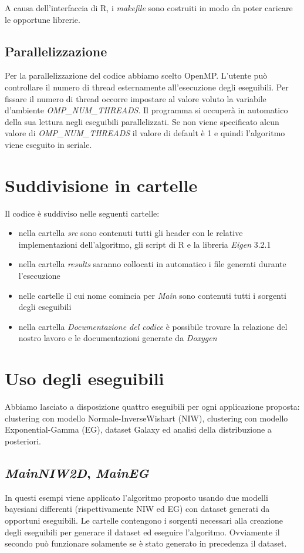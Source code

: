 \documentclass[a4paper,12pt]{report}							%
\begin{document}
A causa dell'interfaccia di R, i \textit{makefile} sono costruiti in modo da poter caricare le opportune librerie.

\section{Parallelizzazione}
Per la parallelizzazione del codice abbiamo scelto OpenMP.
L'utente può controllare il numero di thread esternamente all'esecuzione degli eseguibili.
Per fissare il numero di thread occorre impostare al valore voluto la variabile d'ambiente \textit{OMP\_NUM\_THREADS}. 
Il programma si occuperà in automatico della sua lettura negli eseguibili parallelizzati.
Se non viene specificato alcun valore di \textit{OMP\_NUM\_THREADS} il valore di default è 1 e quindi l'algoritmo
viene eseguito in seriale.

\chapter{Suddivisione in cartelle}
Il codice è suddiviso nelle seguenti cartelle:
\begin{itemize}
 \item nella cartella \textit{src} sono contenuti tutti gli header con le relative implementazioni dell'algoritmo,
 gli script di R e la libreria \textit{Eigen} 3.2.1
 \item nella cartella \textit{results} saranno collocati in automatico i file generati durante l'esecuzione
 \item nelle cartelle il cui nome comincia per \textit{Main} sono contenuti tutti i sorgenti degli eseguibili
 \item nella cartella \textit{Documentazione del codice} è possibile trovare la relazione del nostro lavoro e le documentazioni generate da
 \textit{Doxygen}
\end{itemize}

\chapter{Uso degli eseguibili}
Abbiamo lasciato a disposizione quattro eseguibili per ogni applicazione proposta: clustering con modello 
Normale-InverseWishart (NIW), clustering con modello Exponential-Gamma (EG), dataset Galaxy ed analisi della 
distribuzione a posteriori.

\section{\textit{MainNIW2D}, \textit{MainEG}}
In questi esempi viene applicato l'algoritmo proposto usando due modelli bayesiani differenti 
(rispettivamente NIW ed EG) con dataset generati da opportuni eseguibili. 
Le cartelle contengono i sorgenti necessari alla creazione degli eseguibili per generare il dataset ed
eseguire l'algoritmo. Ovviamente il secondo può funzionare solamente se è stato generato in precedenza il dataset.
\end{document}
